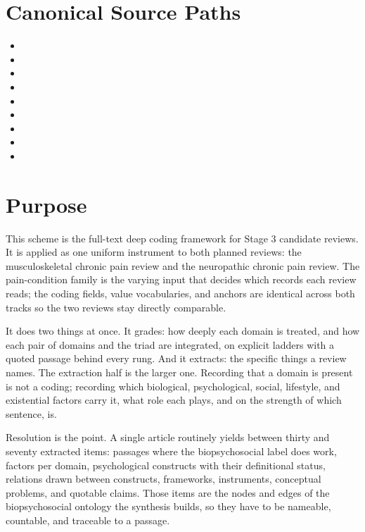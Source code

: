 \documentclass[11pt]{article}
\begin{document}
\section*{Canonical Source Paths}
\begin{itemize}
\item {}
\item {}
\item {}
\item {}
\item {}
\item {}
\item {}
\item {}
\item {}
\end{itemize}

\section*{Purpose}
This scheme is the full-text deep coding framework for Stage 3 candidate reviews. It is applied as one uniform instrument to both planned reviews: the musculoskeletal chronic pain review and the neuropathic chronic pain review. The pain-condition family is the varying input that decides which records each review reads; the coding fields, value vocabularies, and anchors are identical across both tracks so the two reviews stay directly comparable.

It does two things at once. It grades: how deeply each domain is treated, and how each pair of domains and the triad are integrated, on explicit ladders with a quoted passage behind every rung. And it extracts: the specific things a review names. The extraction half is the larger one. Recording that a domain is present is not a coding; recording which biological, psychological, social, lifestyle, and existential factors carry it, what role each plays, and on the strength of which sentence, is.

Resolution is the point. A single article routinely yields between thirty and seventy extracted items: passages where the biopsychosocial label does work, factors per domain, psychological constructs with their definitional status, relations drawn between constructs, frameworks, instruments, conceptual problems, and quotable claims. Those items are the nodes and edges of the biopsychosocial ontology the synthesis builds, so they have to be nameable, countable, and traceable to a passage.
\end{document}
